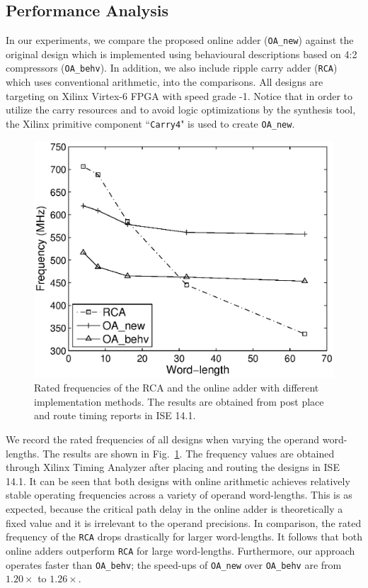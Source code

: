 \documentclass[conference]{IEEEtran}
\begin{document}
\subsection{Performance Analysis}\label{subsec:OA_Performance}
In our experiments, we compare the proposed online adder (\texttt{OA\_new}) against the original design which is implemented using behavioural descriptions based on 4:2 compressors (\texttt{OA\_behv}).  In addition, we also include ripple carry adder (\texttt{RCA}) which uses conventional arithmetic, into the comparisons. All designs are targeting on Xilinx Virtex-6 FPGA with speed grade -1. Notice that in order to utilize the carry resources and to avoid logic optimizations by the synthesis tool, the Xilinx primitive component ``\texttt{Carry4}" is used to create \texttt{OA\_new}.

\begin{figure}[tbp]
	\centering
	\includegraphics[width=.45\textwidth]{./Figures/Exp/Adder_Freq.eps}
	\caption{Rated frequencies of the RCA and the online adder with different implementation methods. The results are obtained from post place and route timing reports in ISE 14.1.}
	\label{Fig:AdderFreq}
	\vspace{-1ex}
\end{figure}


We record the rated frequencies of all designs when varying the operand word-lengths. The results are shown in Fig.~\ref{Fig:AdderFreq}. The frequency values are obtained through Xilinx Timing Analyzer after placing and routing the designs in ISE 14.1. It can be seen that both designs with online arithmetic achieves relatively stable operating frequencies across a variety of operand word-lengths. This is as expected, because the critical path delay in the online adder is theoretically a fixed value and it is irrelevant to the operand precisions. In comparison, the rated frequency of the \texttt{RCA} drops drastically for larger word-lengths. It follows that both online adders outperform \texttt{RCA} for large word-lengths. Furthermore, our approach operates faster than \texttt{OA\_behv}; the speed-ups of \texttt{OA\_new} over \texttt{OA\_behv} are from $1.20\times$ to $1.26\times$.
\end{document}
